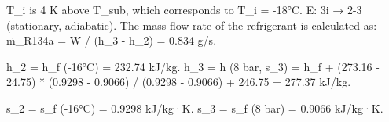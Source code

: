 T_i is 4 K above T_sub, which corresponds to T_i = -18°C.  
E: 3i → 2-3 (stationary, adiabatic).  
The mass flow rate of the refrigerant is calculated as:  
ṁ_R134a = Ẇ / (h_3 - h_2) = 0.834 g/s.  

h_2 = h_f (-16°C) = 232.74 kJ/kg.  
h_3 = h (8 bar, s_3) = h_f + (273.16 - 24.75) * (0.9298 - 0.9066) / (0.9298 - 0.9066) + 246.75 = 277.37 kJ/kg.  

s_2 = s_f (-16°C) = 0.9298 kJ/kg·K.  
s_3 = s_f (8 bar) = 0.9066 kJ/kg·K.